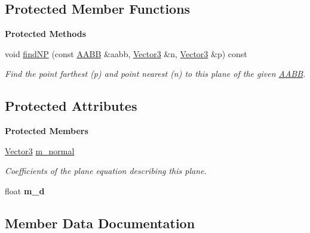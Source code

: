 \subsection*{Protected Member Functions}
\begin{Indent}\textbf{ Protected Methods}\par
\begin{DoxyCompactItemize}
\item 
\mbox{\label{classrev_1_1_bounding_plane_a703eb535e967ebf59fcb3d02e4aa4946}} 
void \mbox{\hyperlink{classrev_1_1_bounding_plane_a703eb535e967ebf59fcb3d02e4aa4946}{find\+NP}} (const \mbox{\hyperlink{classrev_1_1_a_a_b_b}{A\+A\+BB}} \&aabb, \mbox{\hyperlink{classrev_1_1_vector}{Vector3}} \&n, \mbox{\hyperlink{classrev_1_1_vector}{Vector3}} \&p) const
\begin{DoxyCompactList}\small\item\em Find the point farthest (p) and point nearest (n) to this plane of the given \mbox{\hyperlink{classrev_1_1_a_a_b_b}{A\+A\+BB}}. \end{DoxyCompactList}\end{DoxyCompactItemize}
\end{Indent}
\subsection*{Protected Attributes}
\begin{Indent}\textbf{ Protected Members}\par
\begin{DoxyCompactItemize}
\item 
\mbox{\hyperlink{classrev_1_1_vector}{Vector3}} \mbox{\hyperlink{classrev_1_1_bounding_plane_a46adff8de55d9fb5464369adbac24156}{m\+\_\+normal}}
\begin{DoxyCompactList}\small\item\em Coefficients of the plane equation describing this plane. \end{DoxyCompactList}\item 
\mbox{\label{classrev_1_1_bounding_plane_a79dbc9157c45596da8af92399a021c55}} 
float {\bfseries m\+\_\+d}
\end{DoxyCompactItemize}
\end{Indent}


\subsection{Member Data Documentation}
\mbox{\label{classrev_1_1_bounding_plane_a46adff8de55d9fb5464369adbac24156}} 
